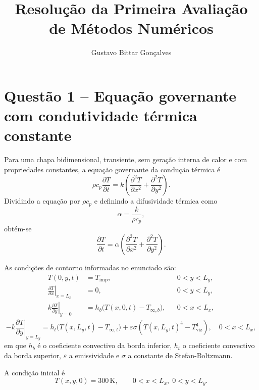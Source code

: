 \documentclass[12pt,a4paper]{article}
\title{Resolução da Primeira Avaliação de Métodos Numéricos}
\author{Gustavo Bittar Gonçalves}
\date{}
\begin{document}
\maketitle
\thispagestyle{fancy}

\section{Questão 1 -- Equação governante com condutividade térmica constante}
Para uma chapa bidimensional, transiente, sem geração interna de calor e com propriedades constantes, a equação governante da condução térmica é
\begin{equation}
\rho c_p \frac{\partial T}{\partial t} = k\left(\frac{\partial^2 T}{\partial x^2} + \frac{\partial^2 T}{\partial y^2}\right).
\end{equation}
Dividindo a equação por $\rho c_p$ e definindo a difusividade térmica como
\begin{equation}
\alpha = \frac{k}{\rho c_p},
\end{equation}
obtém-se
\begin{equation}
\frac{\partial T}{\partial t} = \alpha\left(\frac{\partial^2 T}{\partial x^2} + \frac{\partial^2 T}{\partial y^2}\right).
\label{eq:governante_constante}
\end{equation}

As condições de contorno informadas no enunciado são:
\begin{align}
T(0,y,t) &= T_{\text{imp}}, && 0<y<L_y, \\
\left.\frac{\partial T}{\partial x}\right|_{x=L_x} &= 0, && 0<y<L_y, \\
k\left.\frac{\partial T}{\partial y}\right|_{y=0} &= h_b\bigl(T(x,0,t)-T_{\infty,b}\bigr), && 0<x<L_x,
\end{align}
\begin{equation}
-k\left.\frac{\partial T}{\partial y}\right|_{y=L_y} = h_t\bigl(T(x,L_y,t)-T_{\infty,t}\bigr) + \varepsilon \sigma \left(T(x,L_y,t)^4 - T_{\text{viz}}^4\right), \quad 0<x<L_x,
\end{equation}
em que $h_b$ é o coeficiente convectivo da borda inferior, $h_t$ o coeficiente convectivo da borda superior, $\varepsilon$ a emissividade e $\sigma$ a constante de Stefan-Boltzmann.

A condição inicial é
\begin{equation}
T(x,y,0)=300\,\text{K}, \qquad 0<x<L_x,\;0<y<L_y.
\end{equation}
\end{document}
